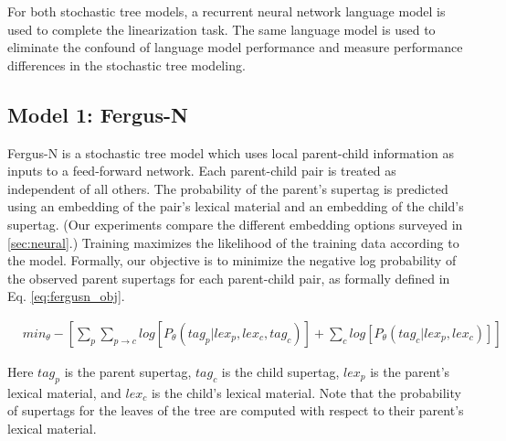 \documentclass[11pt]{article}
\begin{document}
For both stochastic tree models, a recurrent neural network language model is used to complete the linearization task.
%
%
The same language model is used to eliminate the confound of
language model performance and measure performance differences in the
stochastic tree modeling.
%

\subsection{Model 1: Fergus-N}

Fergus-N is a stochastic tree model which uses local parent-child information as inputs to a feed-forward network.
%
Each parent-child pair is treated as independent of all others.
%
The probability of the parent's supertag is predicted using an embedding of the pair's lexical material and an embedding of the child's supertag.
%
(Our experiments compare the different embedding options surveyed in
\ref{sec:neural}.) 
%
Training maximizes the likelihood of the training data according to
the model.
%
Formally, our objective is to minimize the negative log probability of
the observed parent supertags for each parent-child pair, as formally
defined in Eq. \ref{eq:fergusn_obj}.


\begin{align}
&min_{\theta} -[\sum_p\sum_{p\to c} log[P_\theta(tag_{p} | lex_{p}, lex_{c}, tag_{c})] + \sum_c log[P_\theta(tag_{c} |lex_{p}, lex_{c})]] \label{eq:fergusn_obj}
\end{align}

Here $tag_p$ is the parent
supertag, $tag_c$ is the child supertag, $lex_p$ is the parent's
lexical material, and $lex_c$ is the child's lexical material.
%
Note that the probability of supertags for the leaves of the tree are computed
with respect to their parent's lexical material.
\end{document}
